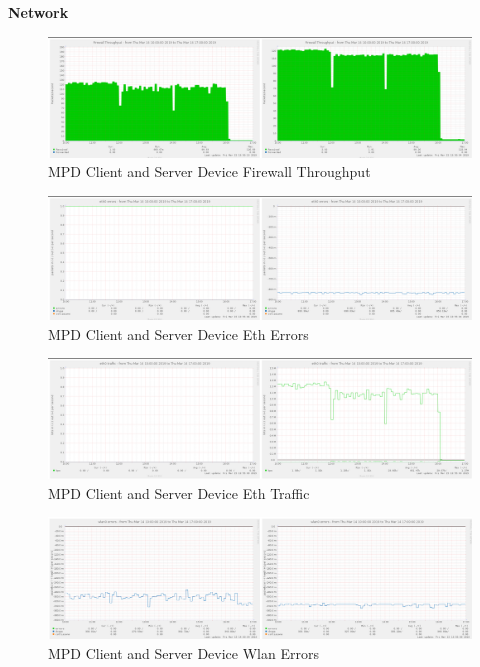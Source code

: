 \documentclass[11pt,a4paper]{scrreprt}
\begin{document}
\textbf{Network}

\begin{figure}[H]
\includegraphics{ResultsAndAnalysis/MPDServerTestImages/011MPDFirewallThroughput.png}
\centering
\caption{MPD Client and Server Device Firewall Throughput}
\label{MPDFirewallThroughput}
\end{figure}

\begin{figure}[H]
\includegraphics{ResultsAndAnalysis/MPDServerTestImages/009MPDEth0Errors.png}
\centering
\caption{MPD Client and Server Device Eth Errors}
\label{MPDEthError}
\end{figure}

\begin{figure}[H]
\includegraphics{ResultsAndAnalysis/MPDServerTestImages/010MPDEth0Traffic.png}
\centering
\caption{MPD Client and Server Device Eth Traffic}
\label{MPDEthTraffic}
\end{figure}

\begin{figure}[H]
\includegraphics{ResultsAndAnalysis/MPDServerTestImages/020MPDWlan0Errors.png}
\centering
\caption{MPD Client and Server Device Wlan Errors}
\label{MPDWlanError}
\end{figure}
\end{document}
